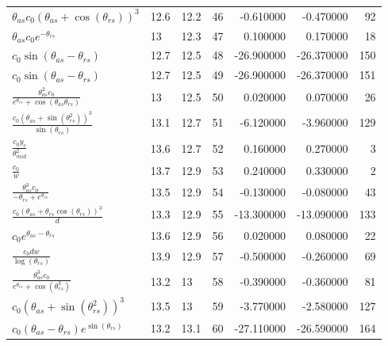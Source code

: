 \begin{tabularx}{\textwidth}{lllrrrr}
$ \theta_{as} c_{0} \left(\theta_{as} + \cos{\left(\theta_{rs} \right)}\right)^{3} $  &  12.6  &  12.2  &  46  &  -0.610000  &  -0.470000  &  92  \\ 
$ \theta_{as} c_{0} e^{- \theta_{rs}} $  &  13\phantom{.0}  &  12.3  &  47  &  0.100000  &  0.170000  &  18  \\ 
$ c_{0} \sin{\left(\theta_{as} - \theta_{rs} \right)} $  &  12.7  &  12.5  &  48  &  -26.900000  &  -26.370000  &  150  \\ 
$ c_{0} \sin{\left(\theta_{as} - \theta_{rs} \right)} $  &  12.7  &  12.5  &  49  &  -26.900000  &  -26.370000  &  151  \\ 
$ \displaystyle\frac{\theta_{as}^{2} c_{0}}{e^{\theta_{rs}} + \cos{\left(\theta_{as} \theta_{rs} \right)}} $  &  13\phantom{.0}  &  12.5  &  50  &  0.020000  &  0.070000  &  26  \\ 
$ \displaystyle\frac{c_{0} \left(\theta_{as} + \sin{\left(\theta_{rs}^{2} \right)}\right)^{3}}{\sin{\left(\theta_{rs} \right)}} $  &  13.1  &  12.7  &  51  &  -6.120000  &  -3.960000  &  129  \\ 
$ \displaystyle\frac{c_{0} y_c}{\theta_{mid}^{2}} $  &  13.6  &  12.7  &  52  &  0.160000  &  0.270000  &  3  \\ 
$ \displaystyle\frac{c_{0}}{w} $  &  13.7  &  12.9  &  53  &  0.240000  &  0.330000  &  2  \\ 
$ \displaystyle\frac{\theta_{as}^{3} c_{0}}{- \theta_{rs} + e^{\theta_{rs}}} $  &  13.5  &  12.9  &  54  &  -0.130000  &  -0.080000  &  43  \\ 
$ \displaystyle\frac{c_{0} \left(\theta_{as} + \theta_{rs} \cos{\left(\theta_{rs} \right)}\right)^{3}}{d} $  &  13.3  &  12.9  &  55  &  -13.300000  &  -13.090000  &  133  \\ 
$ c_{0} e^{\theta_{as} - \theta_{rs}} $  &  13.6  &  12.9  &  56  &  0.020000  &  0.080000  &  22  \\ 
$ \displaystyle\frac{c_{0} d w}{\log{\left(\theta_{rs} \right)}} $  &  13.9  &  12.9  &  57  &  -0.500000  &  -0.260000  &  69  \\ 
$ \displaystyle\frac{\theta_{as}^{3} c_{0}}{e^{\theta_{rs}} + \cos{\left(\theta_{rs}^{3} \right)}} $  &  13.2  &  13\phantom{.0}  &  58  &  -0.390000  &  -0.360000  &  81  \\ 
$ c_{0} \left(\theta_{as} + \sin{\left(\theta_{rs}^{2} \right)}\right)^{3} $  &  13.5  &  13\phantom{.0}  &  59  &  -3.770000  &  -2.580000  &  127  \\ 
$ c_{0} \left(\theta_{as} - \theta_{rs}\right) e^{\sin{\left(\theta_{rs} \right)}} $  &  13.2  &  13.1  &  60  &  -27.110000  &  -26.590000  &  164  \\ 

\end{tabularx}

